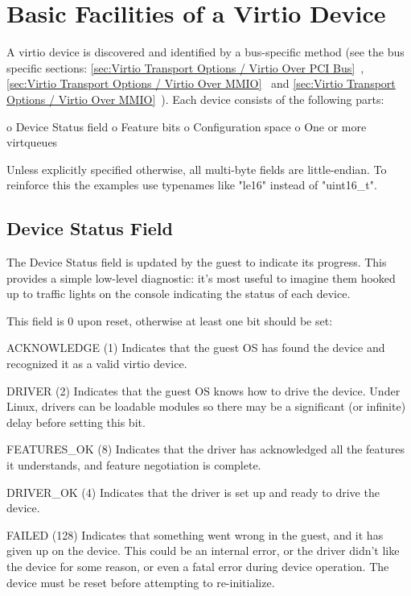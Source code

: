 \chapter{Basic Facilities of a Virtio Device}\label{sec:Basic Facilities of a Virtio Device}

A virtio device is discovered and identified by a bus-specific method
(see the bus specific sections: \ref{sec:Virtio Transport Options / Virtio Over PCI Bus}~,
\ref{sec:Virtio Transport Options / Virtio Over MMIO}~ and \ref{sec:Virtio Transport Options / Virtio Over MMIO}~).  Each
device consists of the following parts:

o Device Status field
o Feature bits
o Configuration space
o One or more virtqueues

Unless explicitly specified otherwise, all multi-byte fields are little-endian.
To reinforce this the examples use typenames like "le16" instead of "uint16_t".

\section{Device Status Field}\label{sec:Basic Facilities of a Virtio Device / Device Status Field}

The Device Status field is updated by the guest to indicate its
progress. This provides a simple low-level diagnostic: it's most
useful to imagine them hooked up to traffic lights on the console
indicating the status of each device.

This field is 0 upon reset, otherwise at least one bit should be set:

  ACKNOWLEDGE (1) Indicates that the guest OS has found the
  device and recognized it as a valid virtio device.

  DRIVER (2) Indicates that the guest OS knows how to drive the
  device. Under Linux, drivers can be loadable modules so there
  may be a significant (or infinite) delay before setting this
  bit.

  FEATURES_OK (8) Indicates that the driver has acknowledged all the
  features it understands, and feature negotiation is complete.

  DRIVER_OK (4) Indicates that the driver is set up and ready to
  drive the device.

  FAILED (128) Indicates that something went wrong in the guest,
  and it has given up on the device. This could be an internal
  error, or the driver didn't like the device for some reason, or
  even a fatal error during device operation. The device must be
  reset before attempting to re-initialize.

